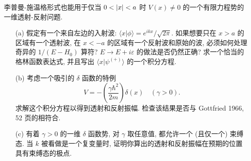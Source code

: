 \documentclass{assignment}
\begin{document}
\begin{prob}[课本习题 6.1]
    李普曼-施温格形式也能用于仅当 $0<\left\lvert x\right\rvert<a$ 时 $V(x)\neq 0$ 的一个有限力程势的一维透射-反射问题.
    \begin{itemize}
        \item[(a)] 假定有一个来自左边的入射波: $\langle x\vert\phi\rangle=e^{ikx}/\sqrt{2\pi}$. 如果想要只在 $x>a$ 的区域有一个透射波, 在 $x<-a$ 的区域有一个反射波和原始的波, 必须如何处理奇异的 $1/(E-H_0)$ 算符? $E\rightarrow E+i\varepsilon$ 的做法是否仍然正确? 求一个恰当的格林函数表达式, 并且写出 $\langle x\vert\psi^{(+)}\rangle$ 的一个积分方程.
        \item[(b)] 考虑一个吸引的 $\delta$ 函数的特例
        \[
            V=-\left(\frac{\gamma\hbar^2}{2m}\right)\delta(x)\quad(\gamma>0).
        \]
        求解这个积分方程以得到透射和反射振幅. 检查该结果是否与 Gottfried 1966, 52 页的相符合.
        \item[(c)] 有着 $\gamma>0$ 的一维 $\delta$ 函数势, 对 $\gamma$ 取任意值, 都允许一个 (且仅一个) 束缚态. 当 $k$ 被看做是一个复变量时, 证明你算出的透射和反射振幅在预期的位置具有束缚态的极点.
    \end{itemize}
\end{prob}
\end{document}
